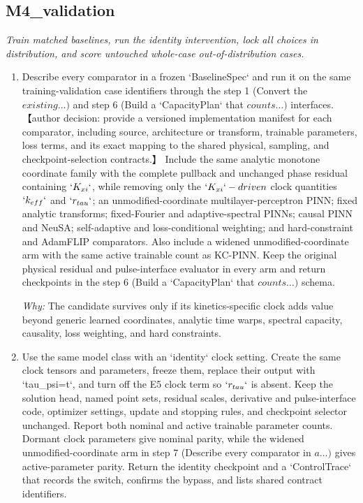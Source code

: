 \documentclass[10pt,a4paper]{article}
\begin{document}
\subsection*{M4\_validation}
\emph{Train matched baselines, run the identity intervention, lock all choices in distribution, and score untouched whole-case out-of-distribution cases.}
\begin{enumerate}[leftmargin=*,start=7]
  \item Describe every comparator in a frozen `BaselineSpec` and run it on the same training-validation case identifiers through the step 1 (Convert the \(existing\dots )\) and step 6 (Build a `CapacityPlan` that \(counts\dots )\) interfaces. 【author decision: provide a versioned implementation manifest for each comparator, including source, architecture or transform, trainable parameters, loss terms, and its exact mapping to the shared physical, sampling, and checkpoint-selection contracts.】 Include the same analytic monotone coordinate family with the complete pullback and unchanged phase residual containing \(`K_{xi}`\), while removing only the \(`K_{xi}`-driven\) clock quantities \(`k_{eff}`\) and \(`r_{tau}`\);\allowbreak{} an unmodified-coordinate multilayer-perceptron PINN;\allowbreak{} fixed analytic transforms;\allowbreak{} fixed-Fourier and adaptive-spectral PINNs;\allowbreak{} causal PINN and NeuSA;\allowbreak{} self-adaptive and loss-conditional weighting;\allowbreak{} and hard-constraint and AdamFLIP comparators. Also include a widened unmodified-coordinate arm with the same active trainable count as KC-PINN. Keep the original physical residual and pulse-interface evaluator in every arm and return checkpoints in the step 6 (Build a `CapacityPlan` that \(counts\dots )\) schema.
\par\emph{Why:} The candidate survives only if its kinetics-specific clock adds value beyond generic learned coordinates, analytic time warps, spectral capacity, causality, loss weighting, and hard constraints.
  \item Use the same model class with an `identity` clock setting. Create the same clock tensors and parameters, freeze them, replace their output with `tau\_psi=t`, and turn off the E5 clock term so \(`r_{tau}`\) is absent. Keep the solution head, named point sets, residual scales, derivative and pulse-interface code, optimizer settings, update and stopping rules, and checkpoint selector unchanged. Report both nominal and active trainable parameter counts. Dormant clock parameters give nominal parity, while the widened unmodified-coordinate arm in step 7 (Describe every comparator in \(a\dots )\) gives active-parameter parity. Return the identity checkpoint and a `ControlTrace` that records the switch, confirms the bypass, and lists shared contract identifiers.

\end{enumerate}
\end{document}
